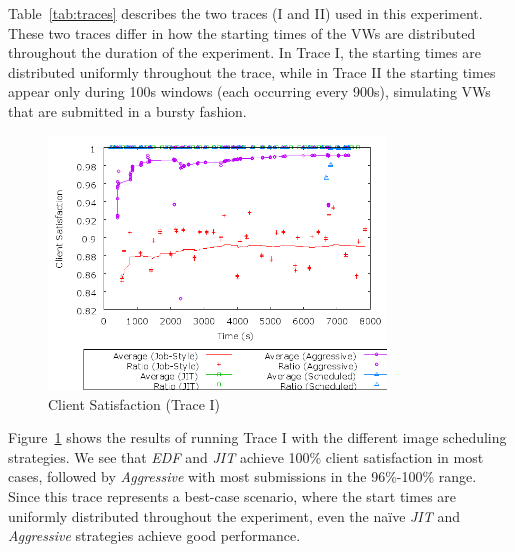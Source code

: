 Table~\ref{tab:traces} describes the two traces (I and II) used in this experiment.
These two traces differ in how the starting times of the VWs are
distributed throughout the duration of the experiment. In Trace I, the
starting times are distributed uniformly throughout the trace, while in
Trace II the starting times appear only during 100s windows (each
occurring every 900s), simulating VWs that are submitted in a bursty
fashion.

\begin{figure}
  \begin{center}
    \includegraphics[width=0.8\textwidth]{figures/ClientSatisfaction-UniformStartTimes.png}
    \caption{Client Satisfaction (Trace I)}
	\label{fig:clientsatisfactionI}
  \end{center}
\end{figure}

Figure~\ref{fig:clientsatisfactionI} shows the results of running Trace I with the different image scheduling
strategies. We see that \emph{EDF} and \emph{JIT} achieve 100\%
client satisfaction in most cases, followed by \emph{Aggressive} with
most submissions in the 96\%{}-100\% range. Since this trace represents
a best{}-case scenario, where the start times are uniformly distributed
throughout the experiment, even the na\"ive \emph{JIT} and
\emph{Aggressive} strategies achieve good performance.

